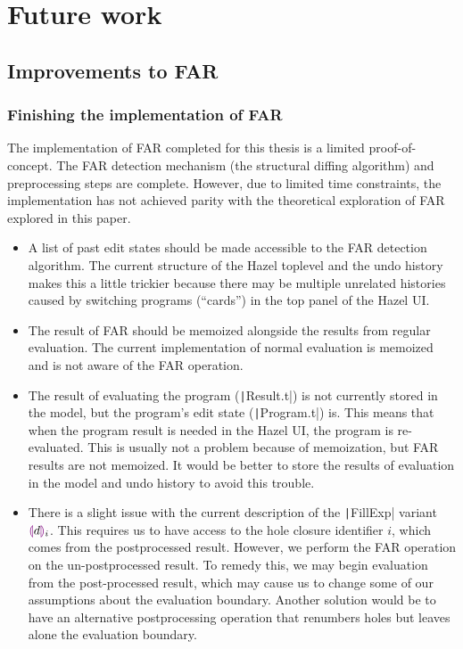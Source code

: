 \chapter{Future work}
\label{sec:future_work}

\section{Improvements to FAR}
\label{sec:far-improvements}

\subsection{Finishing the implementation of FAR}
\label{sec:finishing-far}

The implementation of FAR completed for this thesis is a limited proof-of-concept. The FAR detection mechanism (the structural diffing algorithm) and preprocessing steps are complete. However, due to limited time constraints, the implementation has not achieved parity with the theoretical exploration of FAR explored in this paper.

\begin{itemize}
\item A list of past edit states should be made accessible to the FAR detection algorithm. The current structure of the Hazel toplevel and the undo history makes this a little trickier because there may be multiple unrelated histories caused by switching programs (``cards'') in the top panel of the Hazel UI.
\item The result of FAR should be memoized alongside the results from regular evaluation. The current implementation of normal evaluation is memoized and is not aware of the FAR operation.
\item The result of evaluating the program (\texttt|Result.t|) is not currently stored in the model, but the program's edit state (\texttt|Program.t|) is. This means that when the program result is needed in the Hazel UI, the program is re-evaluated. This is usually not a problem because of memoization, but FAR results are not memoized. It would be better to store the results of evaluation in the model and undo history to avoid this trouble.
\item There is a slight issue with the current description of the \texttt|FillExp| variant $\textcolor{violet}{\llparenthesis} d\textcolor{violet}{\rrparenthesis}_i$. This requires us to have access to the hole closure identifier $i$, which comes from the postprocessed result. However, we perform the FAR operation on the un-postprocessed result. To remedy this, we may begin evaluation from the post-processed result, which may cause us to change some of our assumptions about the evaluation boundary. Another solution would be to have an alternative postprocessing operation that renumbers holes but leaves alone the evaluation boundary.
\end{itemize}

